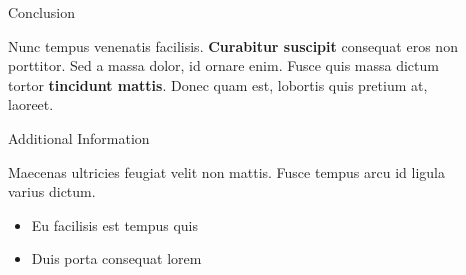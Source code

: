 \documentclass[final]{beamer}
\newlength{\sepwid}
\newlength{\onecolwid}
\newlength{\twocolwid}
\begin{document}
\begin{frame}[t]
\begin{columns}[t]
\begin{column}{\twocolwid}
\begin{columns}[t,totalwidth=\twocolwid]
\begin{column}{\onecolwid}
        \end{column} %

      \end{columns} %

    \end{column} %

  \begin{column}{\sepwid}\end{column} %

    \begin{column}{\onecolwid} %


      \begin{block}{Conclusion}

        Nunc tempus venenatis facilisis. \textbf{Curabitur suscipit} consequat eros non
        porttitor. Sed a massa dolor, id ornare enim. Fusce quis massa dictum tortor
        \textbf{tincidunt mattis}. Donec quam est, lobortis quis pretium at, laoreet.

      \end{block}


      \begin{block}{Additional Information}

        Maecenas ultricies feugiat velit non mattis. Fusce tempus arcu id ligula varius
        dictum.
        \begin{itemize}
          \item Eu facilisis est tempus quis
          \item Duis porta consequat lorem
        \end{itemize}

      \end{block}



\end{column}
\end{columns}
\end{frame}
\end{document}
